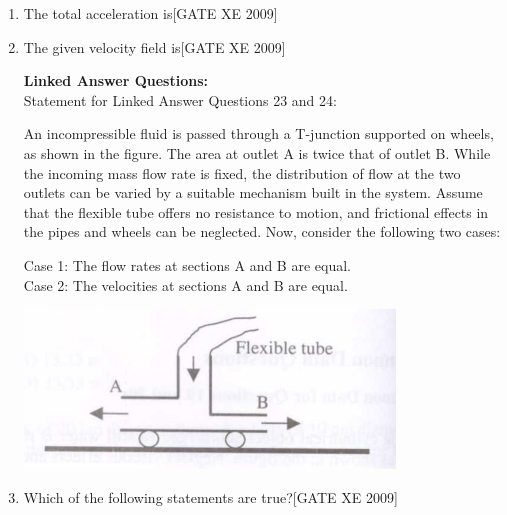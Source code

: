 \documentclass[journal,12pt,onecolumn]{IEEEtran}
\theoremstyle{remark}
\begin{document}
\begin{enumerate}
\item The total acceleration is\hfill[GATE XE 2009]

\begin{enumerate}[leftmargin=*, itemsep=4pt]
\end{enumerate}



\item The given velocity field is\hfill[GATE XE 2009]

\begin{enumerate}[leftmargin=*, itemsep=4pt]
\end{enumerate}




\textbf{Linked Answer Questions:}\\
Statement for Linked Answer Questions 23 and 24:

An incompressible fluid is passed through a T-junction supported on wheels, as shown in the figure. The area at outlet A is twice that of outlet B. While the incoming mass flow rate is fixed, the distribution of flow at the two outlets can be varied by a suitable mechanism built in the system. Assume that the flexible tube offers no resistance to motion, and frictional effects in the pipes and wheels can be neglected. Now, consider the following two cases:

Case 1: The flow rates at sections A and B are equal.\\
Case 2: The velocities at sections A and B are equal.



\includegraphics[width=0.5\columnwidth]{figs/fig5.png}
\item Which of the following statements are true?\hfill[GATE XE 2009]


\end{enumerate}
\end{document}
